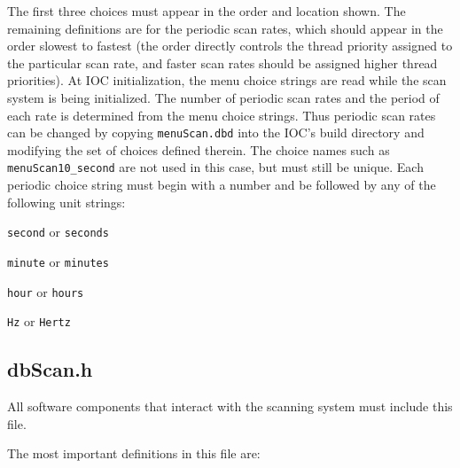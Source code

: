 The first three choices must appear in the order and location shown.
The remaining definitions are for the periodic scan rates, which should appear in the order slowest to fastest (the order directly controls the thread priority assigned to the particular scan rate, and faster scan rates should be assigned higher thread priorities).
At IOC initialization, the menu choice strings are read while the scan system is being initialized.
The number of periodic scan rates and the period of each rate is determined from the menu choice strings.
Thus periodic scan rates can be changed by copying \verb|menuScan.dbd| into the IOC's build directory and modifying the set of choices defined therein.
The choice names such as \verb|menuScan10_second| are not used in this case, but must still be unique.
Each periodic choice string must begin with a number and be followed by any of the following unit strings:

\begin{description}
\item \verb|second| or \verb|seconds|
\item \verb|minute| or \verb|minutes|
\item \verb|hour| or \verb|hours|
\item \verb|Hz| or \verb|Hertz|
\end{description}

\subsection{dbScan.h}

All software components that interact with the scanning system must include this file.

The most important definitions in this file are:

